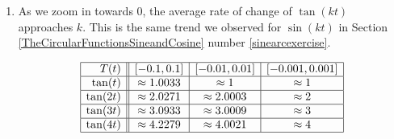 \documentclass{ximera}
\begin{document}
\begin{enumerate}
\setcounter{enumi}{\value{HW}}
\addtocounter{enumi}{1}

\item  As we zoom in towards $0$, the average rate of change of $\tan(k t)$ approaches $k$.  This is the same trend we observed for $\sin(k t)$ in Section \ref{TheCircularFunctionsSineandCosine} number \ref{sinearcexercise}.

\[ \begin{array}{|r||c|c|c|}  \hline

 T(t) &  [-0.1, 0.1] & [-0.01, 0.01] &[-0.001, 0.001] \\ \hline
 \tan(t)     & \approx 1.0033 & \approx 1 & \approx 1 \\  \hline
 \tan(2t)   & \approx 2.0271 & \approx 2.0003 & \approx 2 \\ \hline
 \tan(3t)   & \approx 3.0933 & \approx 3.0009 & \approx 3  \\  \hline
 \tan(4t)   & \approx 4.2279 & \approx 4.0021 & \approx 4  \\  \hline

\end{array} \]


\setcounter{HW}{\value{enumi}}
\end{enumerate}
\end{document}
